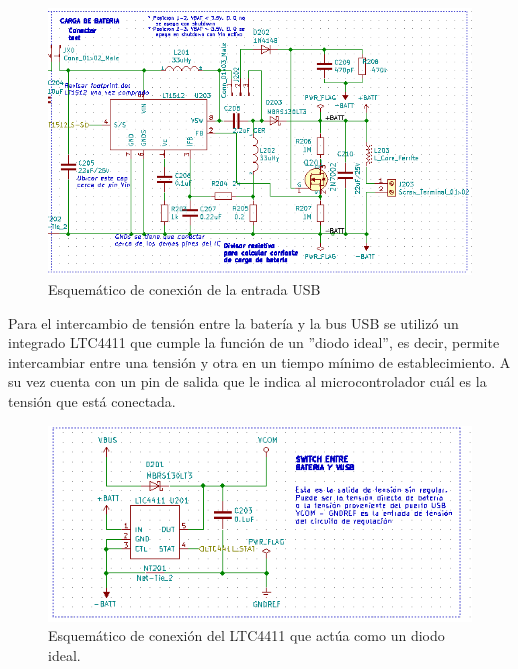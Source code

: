 \begin{figure}[!htbp]
	\centering
	
	\begin{minipage}{0.6\textwidth}
		\includegraphics[width=\textwidth]{./Figures/cargaesq.png}		
	\end{minipage}		
	
	\caption{Esquemático de conexión de la entrada USB}
	\label{fig:cargaesq}
\end{figure}


Para el intercambio de tensión entre la batería y la bus USB se utilizó un integrado LTC4411 que cumple la función de un ''diodo ideal'', es decir, permite intercambiar entre una tensión y otra en un tiempo mínimo de establecimiento. A su vez cuenta con un pin de salida que le indica al microcontrolador cuál es la tensión que está conectada.


\begin{figure}[!htbp]
	\centering
	
	\begin{minipage}{0.6\textwidth}
		\includegraphics[width=\textwidth]{./Figures/switchBateria.png}		
	\end{minipage}		
	
	\caption{Esquemático de conexión del LTC4411 que actúa como un diodo ideal.}
	\label{fig:switchBateria}
\end{figure}

